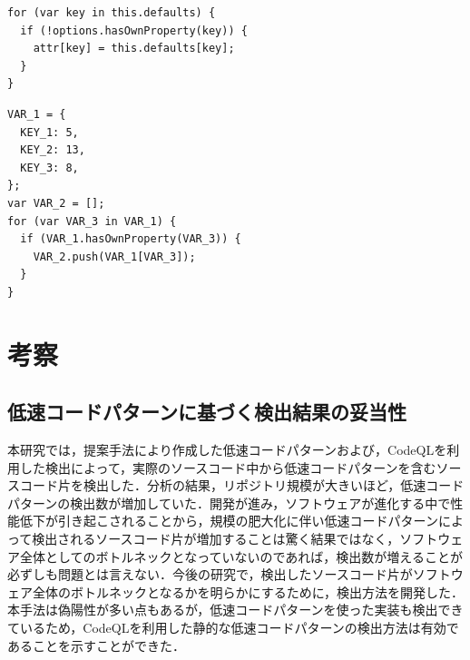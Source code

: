 \documentclass[submit,techrep,noauthor]{ipsj}
\newcommand{\memo}[1]{\colorbox{magenta!30}{{\bf MEMO}:}{\color{red!50} {\textbf{[#1]}}}}
\begin{document}
\begin{lstlisting}[caption=リポジトリ中の高類似度検出例, label=ID3_highcos, captionpos=t, columns=flexible]
for (var key in this.defaults) {
  if (!options.hasOwnProperty(key)) {
    attr[key] = this.defaults[key];
  }
}
\end{lstlisting}


\begin{lstlisting}[caption=マイクロベンチマーク中の高類似度検出例, label=MB_highcos, captionpos=t, columns=flexible]
VAR_1 = {
  KEY_1: 5,
  KEY_2: 13,
  KEY_3: 8,
};
var VAR_2 = [];
for (var VAR_3 in VAR_1) {
  if (VAR_1.hasOwnProperty(VAR_3)) {
    VAR_2.push(VAR_1[VAR_3]);
  }
}
\end{lstlisting}


\section{考察}
\label{sec:discussion}


\subsection{低速コードパターンに基づく検出結果の妥当性}

本研究では，提案手法により作成した低速コードパターンおよび，CodeQLを利用した検出によって，実際のソースコード中から低速コードパターンを含むソースコード片を検出した．分析の結果，リポジトリ規模が大きいほど，低速コードパターンの検出数が増加していた．開発が進み，ソフトウェアが進化する中で性能低下が引き起こされる\cite{emprical_perfomancebug}ことから，規模の肥大化に伴い低速コードパターンによって検出されるソースコード片が増加することは驚く結果ではなく，ソフトウェア全体としてのボトルネックとなっていないのであれば，検出数が増えることが必ずしも問題とは言えない．今後の研究で，検出したソースコード片がソフトウェア全体のボトルネックとなるかを明らかにするために，検出方法を開発した．本手法は偽陽性が多い点もあるが，低速コードパターンを使った実装も検出できているため，CodeQLを利用した静的な低速コードパターンの検出方法は有効であることを示すことができた．

\end{document}

